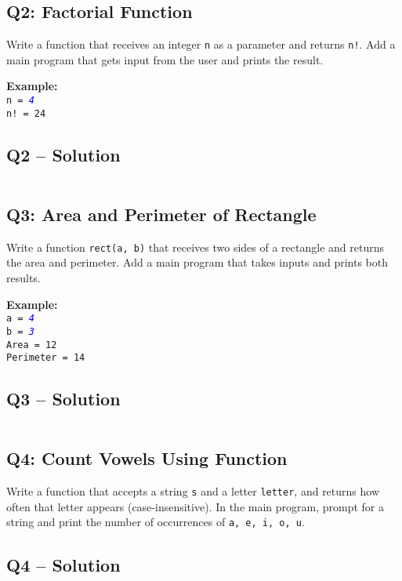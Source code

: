 \documentclass[a4paper,11pt]{article}
\begin{document}
\subsection*{Q2: Factorial Function}
Write a function that receives an integer \texttt{n} as a parameter and returns \texttt{n!}. Add a main program that gets input from the user and prints the result.

\textbf{Example:}\\
\texttt{n = \textcolor{blue}{\textit{4}}}\\
\texttt{n! = 24}

\subsection*{Q2 – Solution}
\inputminted{python}{Files/4/2.py}

\subsection*{Q3: Area and Perimeter of Rectangle}
Write a function \texttt{rect(a, b)} that receives two sides of a rectangle and returns the area and perimeter. Add a main program that takes inputs and prints both results.

\textbf{Example:}\\
\texttt{a = \textcolor{blue}{\textit{4}}}\\
\texttt{b = \textcolor{blue}{\textit{3}}}\\
\texttt{Area = 12}\\
\texttt{Perimeter = 14}

\subsection*{Q3 – Solution}
\inputminted{python}{Files/4/3.py}

\subsection*{Q4: Count Vowels Using Function}
Write a function that accepts a string \texttt{s} and a letter \texttt{letter}, and returns how often that letter appears (case-insensitive). In the main program, prompt for a string and print the number of occurrences of \texttt{a, e, i, o, u}.

\subsection*{Q4 – Solution}
\inputminted{python}{Files/4/4.py}
\end{document}
